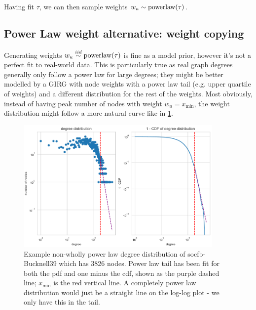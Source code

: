 Having fit $\tau$, we can then sample weights $w_u \sim \operatorname{powerlaw}(\tau)$.


\subsection{Power Law weight alternative: weight copying}
Generating weights $w_u \stackrel{iid}{\sim} \operatorname{powerlaw}(\tau)$ is fine as a model prior, however it's not a perfect fit to real-world data. This is particularly true as real graph degrees generally only follow a power law for large degrees; they might be better modelled by a GIRG with node weights with a power law tail (e.g. upper quartile of weights) and a different distribution for the rest of the weights. Most obviously, instead of having peak number of nodes with weight $w_u = x_{\min}$, the weight distribution might follow a more natural curve like in \cref{fig:natural_weight_distribution}.


\begin{figure}
    \centering
    \includegraphics[width=0.9\textwidth]{./figures/socfb-Bucknell39_3826_nodes_degree_dist_plot.png}
    \caption{Example non-wholly power law degree distribution of socfb-Bucknell39 which has 3826 nodes. Power law tail has been fit for both the pdf and one minus the cdf, shown as the purple dashed line; $x_{\min}$ is the red vertical line. A completely power law distribution would just be a straight line on the log-log plot - we only have this in the tail.}
    \label{fig:natural_weight_distribution}
\end{figure}

